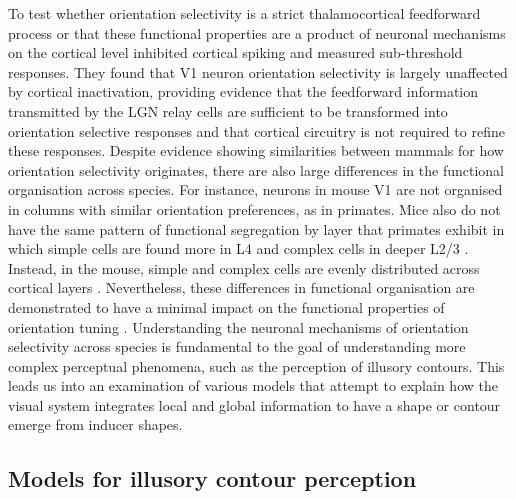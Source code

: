 \documentclass[12pt]{article}
\begin{document}
To test whether orientation selectivity is a strict thalamocortical feedforward process or that these functional properties are a product of neuronal mechanisms on the cortical level \textcite{fersterOrientationSelectivityThalamic1996} inhibited cortical spiking and measured sub-threshold responses. They found that V1 neuron orientation selectivity is largely unaffected by cortical inactivation, providing evidence that the feedforward information transmitted by the LGN relay cells are sufficient to be transformed into orientation selective responses and that cortical circuitry is not required to refine these responses. Despite evidence showing similarities between mammals for how orientation selectivity originates, there are also large differences in the functional organisation across species. For instance, neurons in mouse V1 are not organised in columns with similar orientation preferences, as in primates. Mice also do not have the same pattern of functional segregation by layer that primates exhibit in which simple cells are found more in L4 and complex cells in deeper L2/3 \autocite{martinezReceptiveFieldStructure2005}. Instead, in the mouse, simple and complex cells are evenly distributed across cortical layers \autocite{niellHighlySelectiveReceptive2008}. Nevertheless, these differences in functional organisation are demonstrated to have a minimal impact on the functional properties of orientation tuning \autocite{hooserOrientationSelectivityOrientation2005}. Understanding the neuronal mechanisms of orientation selectivity across species is fundamental to the goal of understanding more complex perceptual phenomena, such as the perception of illusory contours. This leads us into an examination of various models that attempt to explain how the visual system integrates local and global information to have a shape or contour emerge from inducer shapes.    

\subsection{Models for illusory contour perception}

\end{document}
